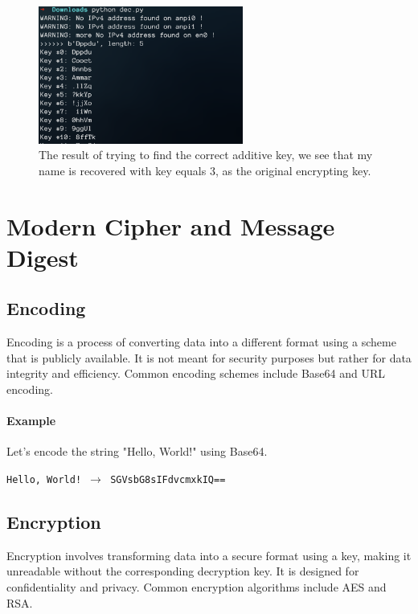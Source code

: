 \documentclass{article}
\begin{document}
\begin{figure}[!hb]
	\centering
	\includegraphics[width=0.6\textwidth]{figures/dec-res}
	\caption{The result of trying to find the correct additive key, we see that my name is recovered with 
  key equals 3, as the original encrypting key.}
	\label{fig:dec-res}
\end{figure}

\section{Modern Cipher and Message Digest} %
\label{sec:Modern Cipher and Message Digest}
\subsection{Encoding}

Encoding is a process of converting data into a different format using a scheme that is publicly available. It is not meant for security purposes but rather for data integrity and efficiency. Common encoding schemes include Base64 and URL encoding.

\paragraph{Example}

Let's encode the string "Hello, World!" using Base64.

\texttt{Hello, World! $\rightarrow$ SGVsbG8sIFdvcmxkIQ==}

\subsection{Encryption}

Encryption involves transforming data into a secure format using a key, making it unreadable without the corresponding decryption key. It is designed for confidentiality and privacy. Common encryption algorithms include AES and RSA.
\end{document}
